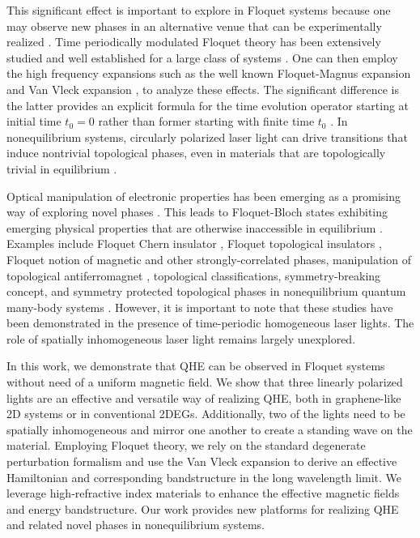 \documentclass[aps,prb,twocolumn,showpacs,superscriptaddress]{revtex4-2}
\begin{document}
This significant effect is important to explore in Floquet systems \cite{NHL, AEE} because one may observe new phases in an alternative venue that can be experimentally realized \cite{MCR, YHW, HZJ, JWM,merboldtObservationFloquetStates2024, choiDirectObservationFloquetBloch2025}.
Time periodically modulated Floquet theory has been extensively studied and well established for a large class of systems \cite{JHS,HSA,MGP,MBL,AEE,NGJ}.
One can then employ the high frequency expansions \cite{MBL,AEE,NGJ,SRI,API,TMS,ESM,TKT,ALA} such as the well known Floquet-Magnus expansion \cite{ESM,TKT,ALA,FCA} and Van Vleck expansion \cite{MBL,AEE}, to analyze these effects.
The significant difference is the latter provides an explicit formula for the time evolution operator starting at initial time $t_{0}=0$ rather than former starting with finite time $t_{0}$ \cite{supp}.
In nonequilibrium systems, circularly polarized laser light can drive transitions that induce nontrivial topological phases, even in materials that are topologically trivial in equilibrium \cite{TKO}.

Optical manipulation of electronic properties has been emerging as a promising way of exploring novel phases \cite{AKA, JHM}.
This leads to Floquet-Bloch states exhibiting emerging physical properties that are otherwise inaccessible in equilibrium \cite{LST}.
Examples include Floquet Chern insulator \cite{AGG}, Floquet topological insulators \cite{rudnerBandStructureEngineering2020}, Floquet notion of magnetic and other strongly-correlated phases\cite{rudnerBandStructureEngineering2020}, manipulation of topological antiferromagnet \cite{bielinskiFloquetBlochManipulation2025}, topological classifications, symmetry-breaking concept, and symmetry protected topological phases in nonequilibrium quantum many-body systems \cite{EKM, rudnerBandStructureEngineering2020}.
However, it is important to note that these studies have been demonstrated in the presence of time-periodic homogeneous laser lights.
The role of spatially inhomogeneous laser light \cite{SWP1, SWP2, SWP3, SWP4, SWP5} remains largely unexplored.

In this work, we demonstrate that QHE can be observed in Floquet systems without need of a uniform magnetic field.
We show that three linearly polarized lights are an effective and versatile way of realizing QHE, both in graphene-like 2D systems or in conventional 2DEGs.
Additionally, two of the lights need to be spatially inhomogeneous and mirror one another to create a standing wave on the material.
Employing Floquet theory, we rely on the standard degenerate perturbation formalism and use the Van Vleck expansion \cite{MBL, AEE} to derive an effective Hamiltonian and corresponding bandstructure in the long wavelength limit.
We leverage high-refractive index materials \cite{shimFundamentalLimitsRefractive2021} to enhance the effective magnetic fields and energy bandstructure.
Our work provides new platforms for realizing QHE and related novel phases in nonequilibrium systems.
\end{document}
